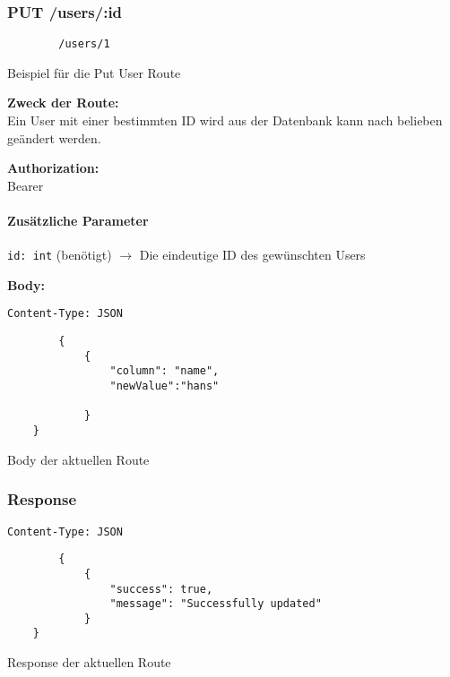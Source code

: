 \pagebreak


\subsubsection{PUT /users/:id}

\begin{code}
    \begin{lstlisting}
        /users/1
    \end{lstlisting}
    \caption{Beispiel für die Put User Route}
\end{code}

\textbf{Zweck der Route:} \\
Ein User mit einer bestimmten ID wird aus der Datenbank kann nach belieben geändert
werden.

\textbf{Authorization:} \\
Bearer

\paragraph{Zusätzliche Parameter}
\lstinline{id: int} (benötigt)
$\rightarrow$ Die eindeutige ID des gewünschten Users

\textbf{Body:}\\
\begin{code}
    \lstinline{Content-Type: JSON}
    \begin{lstlisting}
        {
            {
                "column": "name",
                "newValue":"hans"
    
            }
    }
    \end{lstlisting}
    \caption{Body der aktuellen Route}
\end{code}


\subsubsection{Response}

\begin{code}
    \lstinline{Content-Type: JSON}
    \begin{lstlisting}
        {
            {
                "success": true,
                "message": "Successfully updated"
            }
    }
    \end{lstlisting}
    \caption{Response der aktuellen Route}
\end{code}

\pagebreak

